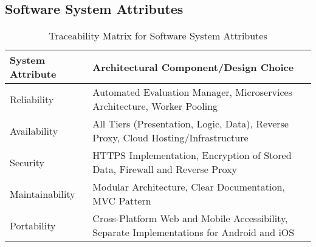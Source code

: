 \subsection{Software System Attributes}
\label{subsec:software_system_attributes}%
\begin{table}[h]
    \centering
    \begin{tabular}{|l|l|}
    \hline
    \textbf{System Attribute} & \textbf{Architectural Component/Design Choice} \\
    \hline
    Reliability & Automated Evaluation Manager, Microservices Architecture, Worker Pooling \\
    \hline
    Availability & All Tiers (Presentation, Logic, Data), Reverse Proxy, Cloud Hosting/Infrastructure \\
    \hline
    Security & HTTPS Implementation, Encryption of Stored Data, Firewall and Reverse Proxy \\
    \hline
    Maintainability & Modular Architecture, Clear Documentation, MVC Pattern \\
    \hline
    Portability & Cross-Platform Web and Mobile Accessibility, Separate Implementations for Android and iOS \\
    \hline
    \end{tabular}
    \caption{Traceability Matrix for Software System Attributes}
    \label{table:software-system-attributes-traceability}
    \end{table}
    